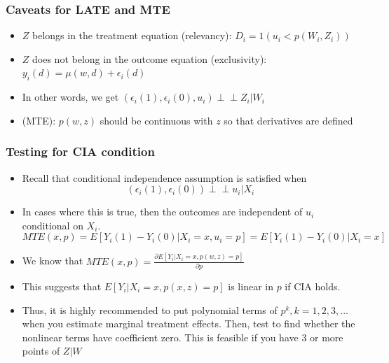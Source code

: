 \documentclass[aspectratio=169]{beamer}
\begin{document}
\begin{frame}
\frametitle{Caveats for LATE and MTE}
\begin{itemize}
\item $Z$ belongs in the treatment equation (relevancy): $D_i=1(u_i<p(W_i,Z_i))$
\item $Z$ does not belong in the outcome equation (exclusivity): $y_i(d)=\mu(w,d)+\epsilon_i(d)$
\item In other words, we get $(\epsilon_i(1), \epsilon_i(0), u_i) \perp\!\!\!\perp Z_i|W_i$
\item (MTE): $p(w,z)$ should be continuous with $z$ so that derivatives are defined
\end{itemize}
\end{frame}

\begin{frame}
\frametitle{Testing for CIA condition}
\begin{itemize}
\item  Recall that conditional independence assumption is satisfied when
\[
(\epsilon_i(1),\epsilon_i(0)) \perp\!\!\!\perp u_i|X_i
\]
\item In cases where this is true, then the outcomes are independent of $u_i$ conditional on $X_i$.
\[
MTE(x,p)=E[Y_i(1)-Y_i(0)|X_i=x, u_i=p]=E[Y_i(1)-Y_i(0)|X_i=x]
\]
\item We know that $MTE(x,p)=\frac{\partial E[Y_i | X_i=x, p(w, z)=p]}{\partial p}$
\item This suggests that $E[Y_i|X_i=x, p(x, z)=p]$ is linear in $p$ if CIA holds. 
\item Thus, it is highly recommended to put polynomial terms of $p^k, k=1,2,3,...$ when you estimate marginal treatment effects. Then, test to find whether the nonlinear terms have coefficient zero. This is feasible if you have 3 or more points of $Z|W$
\end{itemize}
\end{frame}
\end{document}
